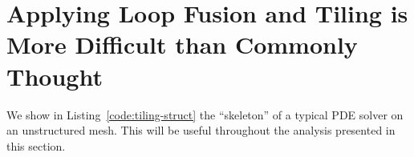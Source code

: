 

\section{Applying Loop Fusion and Tiling is More Difficult than Commonly Thought}
\label{sec:tiling:difficult}
We show in Listing~\ref{code:tiling-struct} the ``skeleton'' of a typical PDE solver on an unstructured mesh. This will be useful throughout the analysis presented in this section.

